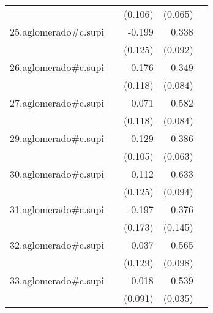 {\begin{longtable}{l*{4}{D{.}{.}{-1}}}
            &                     &     (0.106)         &     (0.065)         &                     \\
\addlinespace
25.aglomerado#c.supi&                     &      -0.199         &       0.338\sym{***}&                     \\
            &                     &     (0.125)         &     (0.092)         &                     \\
\addlinespace
26.aglomerado#c.supi&                     &      -0.176         &       0.349\sym{***}&                     \\
            &                     &     (0.118)         &     (0.084)         &                     \\
\addlinespace
27.aglomerado#c.supi&                     &       0.071         &       0.582\sym{***}&                     \\
            &                     &     (0.118)         &     (0.084)         &                     \\
\addlinespace
29.aglomerado#c.supi&                     &      -0.129         &       0.386\sym{***}&                     \\
            &                     &     (0.105)         &     (0.063)         &                     \\
\addlinespace
30.aglomerado#c.supi&                     &       0.112         &       0.633\sym{***}&                     \\
            &                     &     (0.125)         &     (0.094)         &                     \\
\addlinespace
31.aglomerado#c.supi&                     &      -0.197         &       0.376\sym{**} &                     \\
            &                     &     (0.173)         &     (0.145)         &                     \\
\addlinespace
32.aglomerado#c.supi&                     &       0.037         &       0.565\sym{***}&                     \\
            &                     &     (0.129)         &     (0.098)         &                     \\
\addlinespace
33.aglomerado#c.supi&                     &       0.018         &       0.539\sym{***}&                     \\
            &                     &     (0.091)         &     (0.035)         &                     \\

\end{longtable}}
